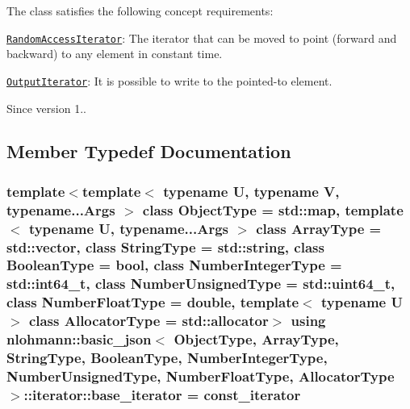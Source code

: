 The class satisfies the following concept requirements\+:
\begin{DoxyItemize}
\item \href{http://en.cppreference.com/w/cpp/concept/RandomAccessIterator}{\tt Random\+Access\+Iterator}\+: The iterator that can be moved to point (forward and backward) to any element in constant time.
\item \href{http://en.cppreference.com/w/cpp/concept/OutputIterator}{\tt Output\+Iterator}\+: It is possible to write to the pointed-\/to element.
\end{DoxyItemize}

\begin{DoxySince}{Since}
version 1.. 
\end{DoxySince}


\subsection{Member Typedef Documentation}
\subsubsection[{\texorpdfstring{base\+\_\+iterator}{base_iterator}}]{\setlength{\rightskip}{0pt plus 5cm}template$<$template$<$ typename U, typename V, typename...\+Args $>$ class Object\+Type = std\+::map, template$<$ typename U, typename...\+Args $>$ class Array\+Type = std\+::vector, class String\+Type  = std\+::string, class Boolean\+Type  = bool, class Number\+Integer\+Type  = std\+::int64\+\_\+t, class Number\+Unsigned\+Type  = std\+::uint64\+\_\+t, class Number\+Float\+Type  = double, template$<$ typename U $>$ class Allocator\+Type = std\+::allocator$>$ using {\bf nlohmann\+::basic\+\_\+json}$<$ Object\+Type, Array\+Type, String\+Type, Boolean\+Type, Number\+Integer\+Type, Number\+Unsigned\+Type, Number\+Float\+Type, Allocator\+Type $>$\+::{\bf iterator\+::base\+\_\+iterator} =  {\bf const\+\_\+iterator}}\hypertarget{classnlohmann_1_1basic__json_1_1iterator_ac48754e4dc48d65d95294bd170dcd857}{}\label{classnlohmann_1_1basic__json_1_1iterator_ac48754e4dc48d65d95294bd170dcd857}

